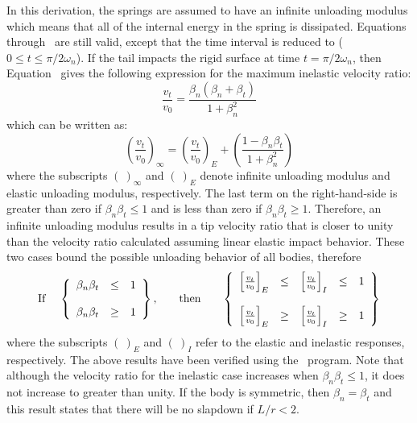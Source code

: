 In this derivation, the springs are assumed to have an infinite
unloading modulus which means that all of the internal energy in the
spring is dissipated.  Equations  through~ are
still valid, except that the time interval is reduced to ($0\leq t\leq
\pi / 2\omega_n$).  If the tail impacts the rigid surface at time
$t=\pi/2\omega_n$, then Equation~ gives the following
expression for the maximum inelastic velocity ratio: 
\begin{equation}
\frac{v_t}{v_0} = \frac{\beta_n(\beta_n+\beta_t)}{1+\beta_n^2}
\label{eq:vrv0i}
\end{equation}
which can be written as:
\begin{equation}
\left(\frac{v_t}{v_0}\right)_\infty = \left(\frac{v_t}{v_0}\right)_E + 
  \left(\frac{1-\beta_n\beta_t}{1+\beta_n^2}\right)\label{eisum}
\end{equation}
where the subscripts $(\ )_\infty$ and $(\ )_E$ denote infinite
unloading modulus and elastic unloading modulus, respectively.  The
last term on the right-hand-side is greater than zero if
$\beta_n\beta_t\leq1$ and is less than zero if $\beta_n\beta_t\geq1$.
Therefore, an infinite unloading modulus results in a tip velocity
ratio that is closer to unity than the velocity ratio calculated
assuming linear elastic impact behavior.  These two cases bound the
possible unloading behavior of all bodies, therefore 
\begin{displaymath}
\begin{array}{cccc}
{\rm If\;} &
   \left\{\begin{array}{rcl}
       \beta_n\beta_t & \leq & 1\\
       {} & {} & {}\\
       \beta_n\beta_t & \geq & 1
   \end{array}\right\}, &
{\quad\rm then\quad} &
   \left\{\begin{array}{rclcl}
       \left[\frac{v_t}{v_0}\right]_E & \leq & 
                       \left[\frac{v_t}{v_0}\right]_I & \leq & 1\\
       {} & {} & {} & {} & {}\\
       \left[\frac{v_t}{v_0}\right]_E & \geq & 
                       \left[\frac{v_t}{v_0}\right]_I & \geq & 1
   \end{array}\right\}
\end{array}
\end{displaymath}
where the subscripts $(\ )_E$ and $(\ )_I$ refer to the elastic and
inelastic responses, respectively. The above results have been verified
using the \SLAP\ program. Note that although the velocity
ratio for the inelastic case increases when $\beta_n\beta_t \leq  1$, it
does not increase to greater than unity.  If the body is symmetric,
then $\beta_n = \beta_t$ and this result states that there will be no
slapdown if $L/r < 2$.

